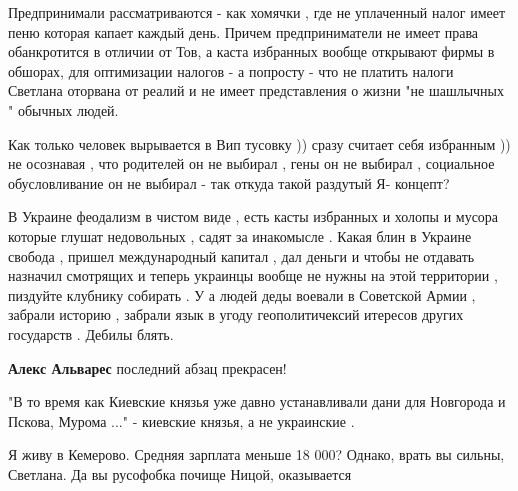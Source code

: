 \begin{itemize}
Предпринимали рассматриваются - как хомячки , где не уплаченный налог имеет
пеню которая капает каждый день. Причем предприниматели не имеет права
обанкротится в отличии от Тов, а каста избранных вообще открывают фирмы в
обшорах, для оптимизации налогов - а попросту - что не платить налоги Светлана
оторвана от реалий и не имеет представления о жизни "не шашлычных " обычных
людей. 

Как только человек вырывается в Вип тусовку )) сразу считает себя избранным ))
не осознавая , что родителей он не выбирал , гены он не выбирал , социальное
обусловливание он не выбирал - так откуда такой раздутый Я- концепт?

В Украине феодализм в чистом виде , есть касты избранных и холопы и мусора
которые глушат недовольных , садят за инакомысле . Какая блин в Украине свобода
, пришел международный капитал , дал деньги и чтобы не отдавать назначил
смотрящих и теперь украинцы вообще не нужны на этой территории , пиздуйте
клубнику собирать . У а людей деды воевали в Советской Армии , забрали историю
, забрали язык в угоду геополитичексий итересов других государств . Дебилы
блять.

\begin{itemize}
 
\textbf{Алекс Альварес} последний абзац прекрасен!
\end{itemize}

 
"В то время как Киевские князья уже давно устанавливали дани для Новгорода и Пскова, Мурома ..." - киевские князья, а не украинские \Smiley[1.0][yellow] .

 
Я живу в Кемерово. Средняя зарплата меньше 18 000? Однако, врать вы сильны, Светлана. Да вы русофобка почище Ницой, оказывается

 

\end{itemize}
